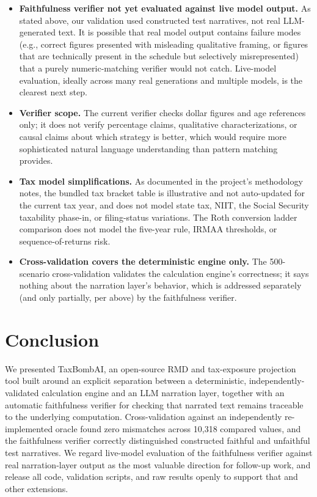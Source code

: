 \documentclass[11pt]{article}
\begin{document}
\begin{itemize}
\item \textbf{Faithfulness verifier not yet evaluated against live model
output.} As stated above, our validation used constructed test
narratives, not real LLM-generated text. It is possible that real model
output contains failure modes (e.g., correct figures presented with
misleading qualitative framing, or figures that are technically present
in the schedule but selectively misrepresented) that a purely
numeric-matching verifier would not catch. Live-model evaluation, ideally
across many real generations and multiple models, is the clearest next
step.
\item \textbf{Verifier scope.} The current verifier checks dollar
figures and age references only; it does not verify percentage claims,
qualitative characterizations, or causal claims about which strategy is
better, which would require more sophisticated natural language
understanding than pattern matching provides.
\item \textbf{Tax model simplifications.} As documented in the project's
methodology notes, the bundled tax bracket table is illustrative and not
auto-updated for the current tax year, and does not model state tax,
NIIT, the Social Security taxability phase-in, or filing-status
variations. The Roth conversion ladder comparison does not model the
five-year rule, IRMAA thresholds, or sequence-of-returns risk.
\item \textbf{Cross-validation covers the deterministic engine only.}
The 500-scenario cross-validation validates the calculation engine's
correctness; it says nothing about the narration layer's behavior, which
is addressed separately (and only partially, per above) by the
faithfulness verifier.
\end{itemize}

\section{Conclusion}

We presented TaxBombAI, an open-source RMD and tax-exposure projection
tool built around an explicit separation between a deterministic,
independently-validated calculation engine and an LLM narration layer,
together with an automatic faithfulness verifier for checking that
narrated text remains traceable to the underlying computation. Cross-validation
against an independently re-implemented oracle found zero
mismatches across 10,318 compared values, and the faithfulness verifier
correctly distinguished constructed faithful and unfaithful test
narratives. We regard live-model evaluation of the faithfulness verifier
against real narration-layer output as the most valuable direction for
follow-up work, and release all code, validation scripts, and raw
results openly to support that and other extensions.
\end{document}

